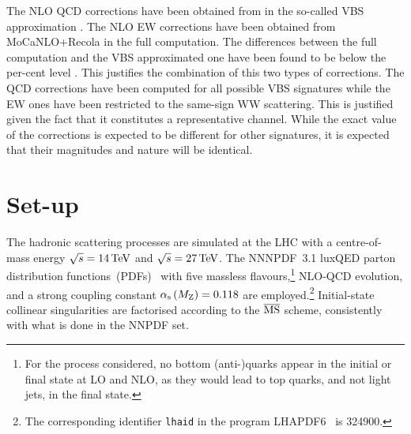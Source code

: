 \documentclass[11pt,epsf]{article}
\begin{document}
The NLO QCD corrections have been obtained from \cite{Arnold:2008rz, Arnold:2011wj, Baglio:2014uba} in the so-called VBS approximation \cite{Ballestrero:2018anz}.
The NLO EW corrections have been obtained from MoCaNLO+Recola \cite{Bendavid:2018nar,Actis:2016mpe,Actis:2016mpe} in the full computation.
The differences between the full computation and the VBS approximated one have been found to be below the per-cent level \cite{Ballestrero:2018anz}.
This justifies the combination of this two types of corrections.
The QCD corrections have been computed for all possible VBS signatures while the EW ones have been restricted to the same-sign WW scattering.
This is justified given the fact that it constitutes a representative channel.
While the exact value of the corrections is expected to be different for other signatures, it is expected that their magnitudes and nature will be identical.

\section{Set-up}

The hadronic scattering processes are simulated at the LHC with a centre-of-mass energy $\sqrt s = 14 \,\text{TeV}$ and $\sqrt s = 27 \,\text{TeV}$.
    The NNNPDF~3.1 luxQED parton distribution functions~(PDFs)~\cite{Bertone:2017bme} with five massless flavours,\footnote{For the process considered, no bottom (anti-)quarks appear in the initial or final state at LO and NLO, as they would lead to top quarks, and not light jets, in the final state.} 
    NLO-QCD evolution, and a strong coupling constant $\alpha_\text{s}\left( M_\text{Z} \right) = 0.118$ are employed.\footnote{The corresponding identifier {\tt lhaid} in the program LHAPDF6~\cite{Buckley:2014ana} is 324900.}
    Initial-state collinear singularities are factorised according to the ${\overline{\rm MS}}$ scheme, consistently with what is done in the NNPDF set.
\end{document}
